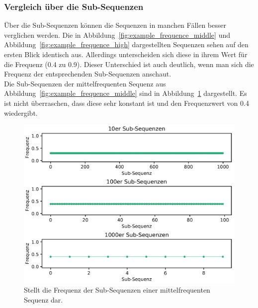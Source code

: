 \subsubsection{Vergleich über die Sub-Sequenzen}
Über die Sub-Sequenzen können die Sequenzen in manchen Fällen besser verglichen werden.
Die in Abbildung~\ref{fig:example_frequence_middle} und Abbildung~\ref{fig:example_frequence_high} dargestellten Sequenzen sehen auf den ersten Blick identisch aus.
Allerdings unterscheiden sich diese in ihrem Wert für die Frequenz (0.4 zu 0.9).
Dieser Unterschied ist auch deutlich, wenn man sich die Frequenz der entsprechenden Sub-Sequenzen anschaut.\\
Die Sub-Sequenzen der mittelfrequenten Sequenz aus Abbildung~\ref{fig:example_frequence_middle} sind in Abbildung~\ref{fig:example_frequence_middle_subsequences} dargestellt. 
Es ist nicht überraschen, dass diese sehr konstant ist und den Frequenzwert von 0.4 wiedergibt.
\begin{figure}[H]
	\includegraphics[width=\linewidth]{pythonImplementation/images/example_frequence_middle_subsequences.PNG}
	\caption[Darstellung der Sub-Sequenzen im Bezug auf die Frequenz einer mittelfrequenten Sequenz]{Stellt die Frequenz der Sub-Sequenzen einer mittelfrequenten Sequenz dar\footnotemark.}
	\label{fig:example_frequence_middle_subsequences}
\end{figure}


